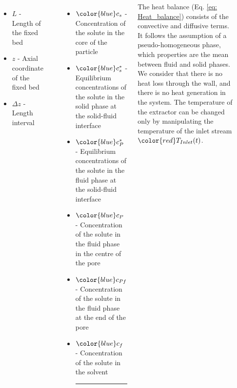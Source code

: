 \documentclass[17pt, a0paper, portrait, margin=10mm, innermargin=15mm, blockverticalspace=15mm, colspace=15mm, subcolspace=8mm]{tikzposter}
\begin{document}
\begin{columns}
{\begin{minipage}[c]{0.5\linewidth}
\begin{tikzfigure}
						\label{SFE_Mechanism}
					\end{tikzfigure}
				\end{minipage}
				\hspace{2.0cm}
				\begin{minipage}[c]{0.44\linewidth}
					\vspace{0.2cm}
						\begin{itemize}
							\item[] $L$ - Length of the fixed bed
							\item[] $z$ - Axial coordinate of the fixed bed
							\item[] $\Delta z$ - Length interval
						\end{itemize}
					\hrule
					\begin{itemize}
						\item[] ${\color{blue}c_s}$ - Concentration of the solute in the core of the particle
						\item[] ${\color{blue}c_s^*}$ - Equilibrium concentrations of the solute in the solid phase at the solid-fluid interface
						\item[] ${\color{blue}c_P^*}$ - Equilibrium concentrations of the solute in the fluid phase at the solid-fluid interface
						\item[] ${\color{blue}c_{P}}$ - Concentration of the solute in the fluid phase in the centre of the pore
						\item[] ${\color{blue}c_{Pf}}$ - Concentration of the solute in the fluid phase at the end of the pore
						\item[] ${\color{blue}c_f}$ - Concentration of the solute in the solvent 
						\vspace{0.2cm}
						\hrule
					\end{itemize}
				\end{minipage}
					
					
			\vspace{1.5cm}
			
			The heat balance (Eq. \ref{eq: Heat_balance}) consists of the convective and diffusive terms. It follows the assumption of a pseudo-homogeneous phase, which properties are the mean between fluid and solid phases. We consider that there is no heat loss through the wall, and there is no heat generation in the system. The temperature of the extractor can be changed only by manipulating the temperature of the inlet stream ${\color{red}T_{Inlet}}(t)$.
			
}
\end{columns}
\end{document}
